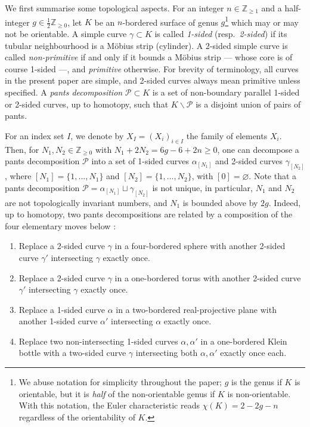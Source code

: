 \documentclass[12pt]{amsart}
\theoremstyle{plain}
\theoremstyle{definition}
\theoremstyle{remark}
\numberwithin{equation}{section}
\begin{document}
We first summarise some topological aspects. For an integer $n\in\mathbb{Z}_{\geq1}$ and a half-integer $g\in\frac12\mathbb{Z}_{\geq0}$, let $K$ be an $n$-bordered surface of genus $g$\footnote{We abuse notation for simplicity throughout the paper; $g$ is the genus if $K$ is orientable, but it is \emph{half} of the non-orientable genus if $K$ is non-orientable. With this notation, the Euler characteristic reads $\chi(K)=2-2g-n$ regardless of the orientability of $K$.} which may or may not be orientable. A simple curve $\gamma\subset K$ is called \emph{1-sided} (resp.~\emph{2-sided}) if its tubular neighbourhood is a M\"{o}bius strip (cylinder). A 2-sided simple curve is called \emph{non-primitive} if and only if it bounds a M\"{o}bius strip --- whose core is of course 1-sided ---, and \emph{primitive} otherwise. For brevity of terminology, all curves in the present paper are simple, and 2-sided curves always mean primitive unless specified. A \emph{pants decomposition} $\mathcal{P}\subset K$ is a set of non-boundary parallel 1-sided or 2-sided curves, up to homotopy, such that $K\backslash \mathcal{P}$ is a disjoint union of pairs of pants.

For an index set $I$, we denote by $X_{I}=(X_i)_{i\in I}$ the family of elements $X_i$. Then, for $N_1,N_2\in\mathbb{Z}_{\geq0}$ with $N_1+2N_2 = 6g-6+2n\geq0$, one can decompose a pants decomposition $\mathcal{P}$ into a set of 1-sided curves $\alpha_{[N_1]}$ and 2-sided curves $\gamma_{[N_2]}$, where $[N_1]=\{1,...,N_1\}$ and $[N_2]=\{1,...,N_2\}$, with $[0]=\varnothing$. Note that a pants decomposition $\mathcal{P}=\alpha_{[N_1]}\sqcup \gamma_{[N_2]}$ is not unique, in particular, $N_1$ and $N_2$ are not topologically invariant numbers, and $N_1$ is bounded above by $2g$. Indeed, up to homotopy, two pants decompositions are related by a composition of the four elementary moves below \cite{PP13}:
\begin{enumerate}
\item Replace a 2-sided curve $\gamma$ in a four-bordered sphere with another 2-sided curve $\gamma'$ intersecting $\gamma$ exactly once.
\item Replace a 2-sided curve $\gamma$ in a one-bordered torus with another 2-sided curve $\gamma'$ intersecting $\gamma$ exactly once.
\item Replace a 1-sided curve $\alpha$ in a two-bordered real-projective plane with another 1-sided curve $\alpha'$ intersecting $\alpha$ exactly once.
\item Replace two non-intersecting 1-sided curves $\alpha,\alpha'$ in a one-bordered Klein bottle with a two-sided curve $\gamma$ intersecting both $\alpha,\alpha'$ exactly once each.
\end{enumerate}
\end{document}
